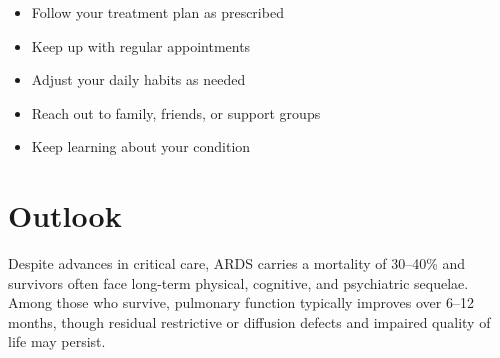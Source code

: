 \begin{itemize}[noitemsep]
  \item Follow your treatment plan as prescribed
  \item Keep up with regular appointments
  \item Adjust your daily habits as needed
  \item Reach out to family, friends, or support groups
  \item Keep learning about your condition
\end{itemize}

\section{Outlook}
Despite advances in critical care, ARDS carries a mortality of 30--40\% and survivors often face long-term physical, cognitive, and psychiatric sequelae. Among those who survive, pulmonary function typically improves over 6--12 months, though residual restrictive or diffusion defects and impaired quality of life may persist.
